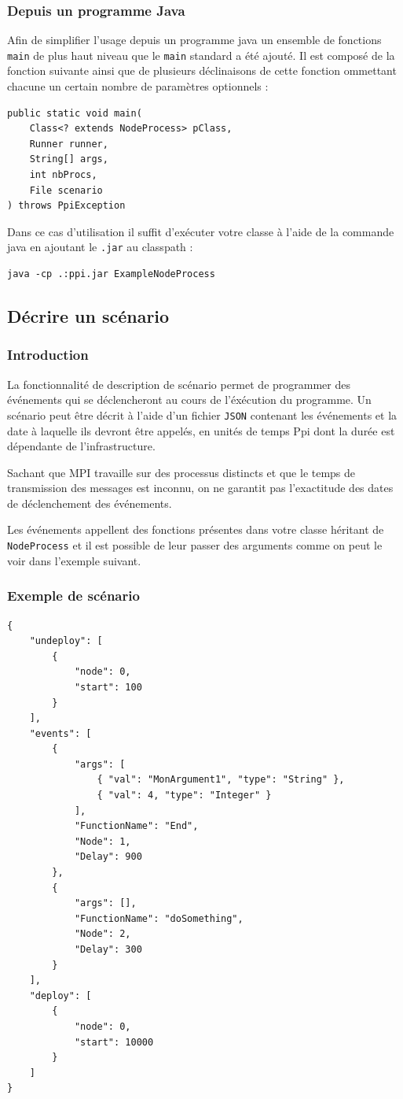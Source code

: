 \documentclass{article}
\begin{document}
		\subsubsection{Depuis un programme Java}
		Afin de simplifier l'usage depuis un programme java un ensemble de fonctions
		\lstinline{main} de plus haut niveau que le \lstinline{main} standard a été ajouté. Il est
		composé de la fonction suivante ainsi que de plusieurs déclinaisons de cette fonction
		ommettant chacune un certain nombre de paramètres optionnels :
		\begin{lstlisting}
public static void main(
	Class<? extends NodeProcess> pClass,
	Runner runner,
	String[] args,
	int nbProcs,
	File scenario
) throws PpiException
		\end{lstlisting}
		Dans ce cas d'utilisation il suffit d'exécuter votre classe à l'aide de la commande java en
		ajoutant le \lstinline{.jar} au classpath :
		\begin{lstlisting}
java -cp .:ppi.jar ExampleNodeProcess
		\end{lstlisting}
		\newpage
		\subsection{Décrire un scénario}
		\subsubsection{Introduction}
		La fonctionnalité de description de scénario permet de programmer des événements qui se
		déclencheront au cours de l'éxécution du programme. Un scénario peut être décrit à l'aide
		d'un fichier \lstinline{JSON} contenant les événements et la date à laquelle ils devront
		être appelés, en unités de temps Ppi dont la durée est dépendante de l'infrastructure.

		Sachant que MPI travaille sur des processus distincts et que le temps de transmission des
		messages est inconnu, on ne garantit pas l'exactitude des dates de déclenchement des
		événements.
		\bigskip

			Les événements appellent des fonctions présentes dans votre classe héritant de
			\lstinline{NodeProcess} et il est possible de leur passer des arguments comme on peut le
			voir dans l'exemple suivant.
			\subsubsection{Exemple de scénario}
			\begin{lstlisting}
{
	"undeploy": [
		{
			"node": 0,
			"start": 100
		}
	],
	"events": [
		{
			"args": [
				{ "val": "MonArgument1", "type": "String" },
				{ "val": 4, "type": "Integer" }
			],
			"FunctionName": "End",
			"Node": 1,
			"Delay": 900
		},
		{
			"args": [],
			"FunctionName": "doSomething",
			"Node": 2,
			"Delay": 300
		}
	],
	"deploy": [
		{
			"node": 0,
			"start": 10000
		}
	]
}
			\end{lstlisting}
\end{document}
